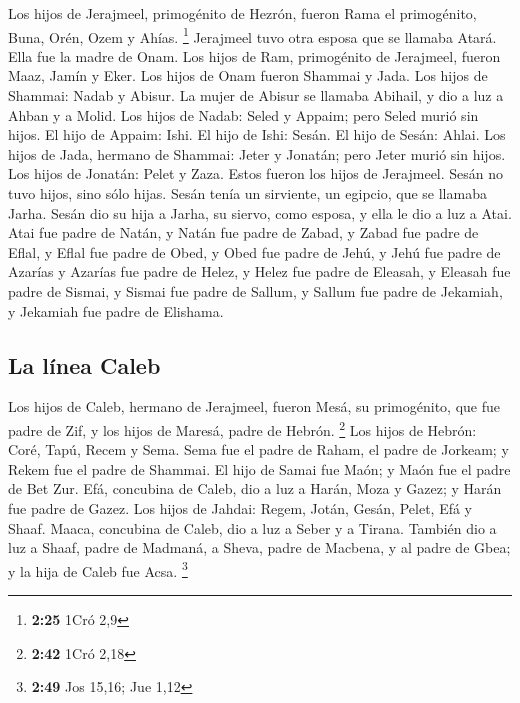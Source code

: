  Los hijos de Jerajmeel, primogénito de Hezrón, fueron
Rama el primogénito, Buna, Orén, Ozem y Ahías. \footnote{\textbf{2:25}
  1Cró 2,9}  Jerajmeel tuvo otra esposa que se llamaba
Atará. Ella fue la madre de Onam.  Los hijos de Ram,
primogénito de Jerajmeel, fueron Maaz, Jamín y Eker.  Los
hijos de Onam fueron Shammai y Jada. Los hijos de Shammai: Nadab y
Abisur.  La mujer de Abisur se llamaba Abihail, y dio a
luz a Ahban y a Molid.  Los hijos de Nadab: Seled y
Appaim; pero Seled murió sin hijos.  El hijo de Appaim:
Ishi. El hijo de Ishi: Sesán. El hijo de Sesán: Ahlai. 
Los hijos de Jada, hermano de Shammai: Jeter y Jonatán; pero Jeter murió
sin hijos.  Los hijos de Jonatán: Pelet y Zaza. Estos
fueron los hijos de Jerajmeel.  Sesán no tuvo hijos, sino
sólo hijas. Sesán tenía un sirviente, un egipcio, que se llamaba Jarha.
 Sesán dio su hija a Jarha, su siervo, como esposa, y
ella le dio a luz a Atai.  Atai fue padre de Natán, y
Natán fue padre de Zabad,  y Zabad fue padre de Eflal, y
Eflal fue padre de Obed,  y Obed fue padre de Jehú, y
Jehú fue padre de Azarías  y Azarías fue padre de Helez,
y Helez fue padre de Eleasah,  y Eleasah fue padre de
Sismai, y Sismai fue padre de Sallum,  y Sallum fue padre
de Jekamiah, y Jekamiah fue padre de Elishama.

\hypertarget{la-luxednea-caleb-1}{%
\subsection{La línea Caleb}\label{la-luxednea-caleb-1}}

 Los hijos de Caleb, hermano de Jerajmeel, fueron Mesá,
su primogénito, que fue padre de Zif, y los hijos de Maresá, padre de
Hebrón. \footnote{\textbf{2:42} 1Cró 2,18}  Los hijos de
Hebrón: Coré, Tapú, Recem y Sema.  Sema fue el padre de
Raham, el padre de Jorkeam; y Rekem fue el padre de Shammai.
 El hijo de Samai fue Maón; y Maón fue el padre de Bet
Zur.  Efá, concubina de Caleb, dio a luz a Harán, Moza y
Gazez; y Harán fue padre de Gazez.  Los hijos de Jahdai:
Regem, Jotán, Gesán, Pelet, Efá y Shaaf.  Maaca,
concubina de Caleb, dio a luz a Seber y a Tirana. 
También dio a luz a Shaaf, padre de Madmaná, a Sheva, padre de Macbena,
y al padre de Gbea; y la hija de Caleb fue Acsa. \footnote{\textbf{2:49}
  Jos 15,16; Jue 1,12}

